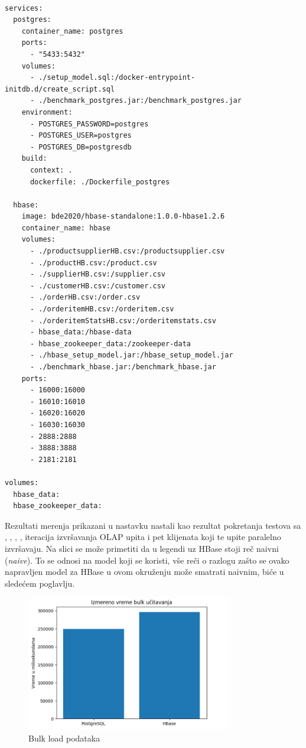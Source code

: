 \documentclass[12pt,oneside]{memoir}
\begin{document}
\begin{lstlisting}[title={docker-compose.yml},captionpos=t]

services: 
  postgres:
    container_name: postgres
    ports:
      - "5433:5432"
    volumes:
      - ./setup_model.sql:/docker-entrypoint-initdb.d/create_script.sql
      - ./benchmark_postgres.jar:/benchmark_postgres.jar
    environment:
      - POSTGRES_PASSWORD=postgres
      - POSTGRES_USER=postgres
      - POSTGRES_DB=postgresdb
    build:
      context: .
      dockerfile: ./Dockerfile_postgres

  hbase:
    image: bde2020/hbase-standalone:1.0.0-hbase1.2.6
    container_name: hbase
    volumes:
      - ./productsupplierHB.csv:/productsupplier.csv
      - ./productHB.csv:/product.csv
      - ./supplierHB.csv:/supplier.csv
      - ./customerHB.csv:/customer.csv
      - ./orderHB.csv:/order.csv
      - ./orderitemHB.csv:/orderitem.csv
      - ./orderitemStatsHB.csv:/orderitemstats.csv
      - hbase_data:/hbase-data
      - hbase_zookeeper_data:/zookeeper-data
      - ./hbase_setup_model.jar:/hbase_setup_model.jar
      - ./benchmark_hbase.jar:/benchmark_hbase.jar
    ports:
      - 16000:16000
      - 16010:16010
      - 16020:16020
      - 16030:16030
      - 2888:2888
      - 3888:3888
      - 2181:2181

volumes:
  hbase_data:
  hbase_zookeeper_data:
\end{lstlisting}



Rezultati merenja prikazani u nastavku nastali kao rezultat pokretanja testova sa , , , ,  iteracija izvršavanja OLAP upita i pet klijenata koji te upite paralelno izvršavaju. Na slici se može primetiti da u legendi uz HBase stoji reč naivni (\textit{naive}). To se odnosi na model koji se koristi, vše reči o razlogu zašto se ovako napravljen model za HBase u ovom okruženju može smatrati naivnim, biće u sledećem poglavlju.

\begin{figure}[!ht]
  \centering
  \includegraphics[width=0.8\textwidth]{bulk-load-vizualization.png}
  \caption{Bulk load podataka}
  \label{fig:grafikon}
\end{figure}
\end{document}
